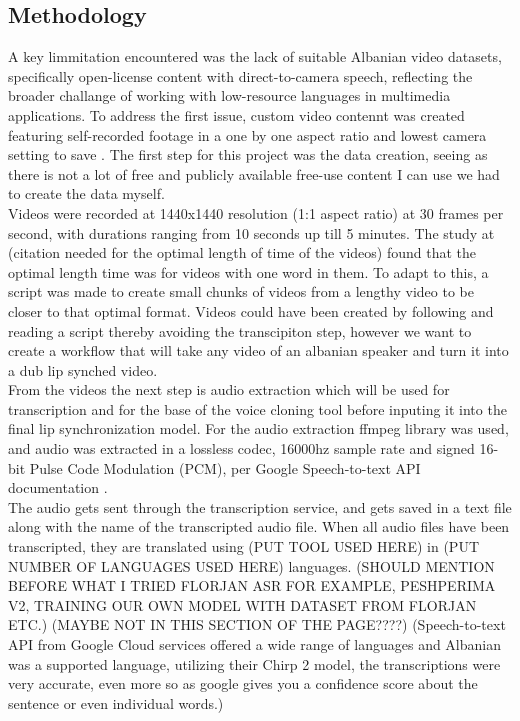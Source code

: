 \documentclass[12pt]{article}
\begin{document}
\subsection{Methodology}
A key limmitation encountered was the lack of suitable Albanian video datasets, specifically open-license content with direct-to-camera speech, reflecting the broader challange of working with low-resource languages in multimedia applications. To address the first issue, custom video contennt was created featuring self-recorded footage in a one by one aspect ratio and lowest camera setting to save .
The first step for this project was the data creation, seeing as there is not a lot of free and publicly available free-use content I can use we had to create the data myself.\\
Videos were recorded at 1440x1440 resolution (1:1 aspect ratio) at 30 frames per second, with durations ranging from 10 seconds up till 5 minutes. The study at (citation needed for the optimal length of time of the videos) found that the optimal length time was for videos with one word in them. To adapt to this, a script was made to create small chunks of videos from a lengthy video to be closer to that optimal format. Videos could have been created by following and reading a script thereby avoiding the transcipiton step, however we want to create a workflow that will take any video of an albanian speaker and turn it into a dub lip synched video.\\
From the videos the next step is audio extraction which will be used for transcription and for the base of the voice cloning tool before inputing it into the final lip synchronization model. For the audio extraction ffmpeg library was used, and audio was extracted in a lossless codec, 16000hz sample rate and signed 16-bit Pulse Code Modulation (PCM), per Google Speech-to-text API documentation \cite{google_api_docs}.
\\
The audio gets sent through the transcription service, and gets saved in a text file along with the name of the transcripted audio file.
When all audio files have been transcripted, they are translated using (PUT TOOL USED HERE) in (PUT NUMBER OF LANGUAGES USED HERE) languages.
(SHOULD MENTION BEFORE WHAT I TRIED FLORJAN ASR FOR EXAMPLE, PESHPERIMA V2, TRAINING OUR OWN MODEL WITH DATASET FROM FLORJAN ETC.) (MAYBE NOT IN THIS SECTION OF THE PAGE????)
(Speech-to-text API from Google Cloud services offered a wide range of languages and Albanian was a supported language, utilizing their Chirp 2 model, the transcriptions were very accurate, even more so as google gives you a confidence score about the sentence or even individual words.)\\
\end{document}
